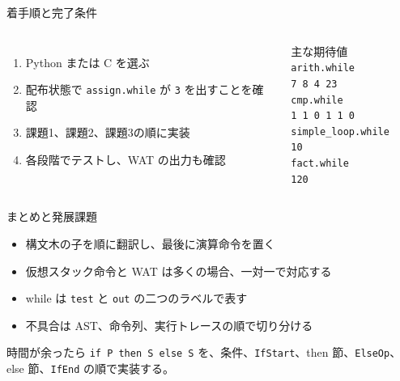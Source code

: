 \documentclass[aspectratio=169,11pt]{beamer}
\begin{document}
\begin{frame}{着手順と完了条件}
  \begin{columns}[T,onlytextwidth]
      \begin{enumerate}\setlength\itemsep{0.55em}
        \item Python または C を選ぶ
        \item 配布状態で \texttt{assign.while} が \texttt{3} を出すことを確認
        \item 課題1、課題2、課題3の順に実装
        \item 各段階でテストし、WAT の出力も確認
      \end{enumerate}
      \begin{block}{主な期待値}
        \texttt{arith.while}\\
        \quad\texttt{7 8 4 23}\\[0.35em]
        \texttt{cmp.while}\\
        \quad\texttt{1 1 0 1 1 0}\\[0.35em]
        \texttt{simple\_loop.while}\\
        \quad\texttt{10}\\[0.35em]
        \texttt{fact.while}\\
        \quad\texttt{120}
      \end{block}
  \end{columns}
\end{frame}

\begin{frame}{まとめと発展課題}
  \begin{itemize}\setlength\itemsep{0.65em}
    \item 構文木の子を順に翻訳し、最後に演算命令を置く
    \item 仮想スタック命令と WAT は多くの場合、一対一で対応する
    \item while は \texttt{test} と \texttt{out} の二つのラベルで表す
    \item 不具合は AST、命令列、実行トレースの順で切り分ける
  \end{itemize}
  \vspace{0.55em}
  \begin{block}{時間が余ったら}
    \texttt{if P then S else S} を、条件、\texttt{IfStart}、then 節、\texttt{ElseOp}、else 節、\texttt{IfEnd} の順で実装する。
  \end{block}
\end{frame}
\end{document}
